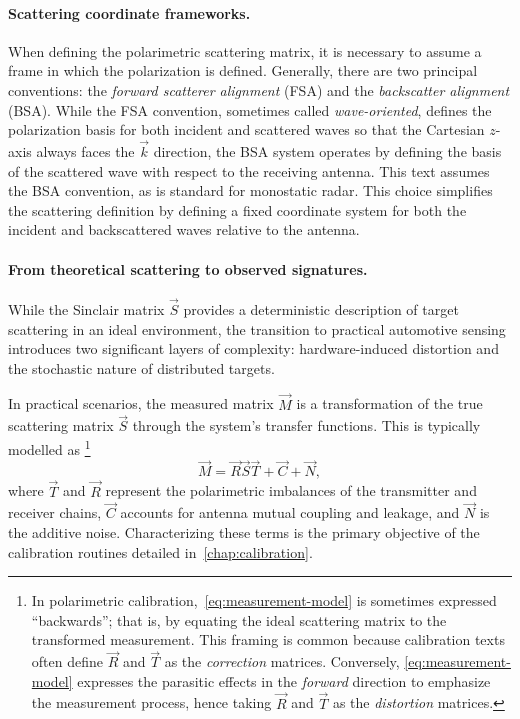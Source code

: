 \paragraph{Scattering coordinate frameworks.}
When defining the polarimetric scattering matrix, it is necessary to assume a frame in which the polarization is defined.
Generally, there are two principal conventions: the \emph{forward scatterer alignment} (FSA) and the \emph{backscatter alignment} (BSA).
While the FSA convention, sometimes called \emph{wave-oriented}, defines the polarization basis for both incident and scattered waves so that the Cartesian $z$-axis always faces the $\vec k$ direction, the BSA system operates by defining the basis of the scattered wave with respect to the receiving antenna.
This text assumes the BSA convention, as is standard for monostatic radar.
This choice simplifies the scattering definition by defining a fixed coordinate system for both the incident and backscattered waves relative to the antenna.

\paragraph{From theoretical scattering to observed signatures.}
While the Sinclair matrix $\vec S$ provides a deterministic description of target scattering in an ideal environment, the transition to practical automotive sensing introduces two significant layers of complexity: hardware-induced distortion and the stochastic nature of distributed targets.

In practical scenarios, the measured matrix $\vec M$ is a transformation of the true scattering matrix $\vec S$ through the system's transfer functions.
This is typically modelled as%
    \footnote{
        In polarimetric calibration,~\cref{eq:measurement-model} is sometimes expressed \enquote{backwards}; that is, by equating the ideal scattering matrix to the transformed measurement.
        This framing is common because calibration texts often define $\vec R$ and $\vec T$ as the \emph{correction} matrices.
        Conversely, \cref{eq:measurement-model} expresses the parasitic effects in the \emph{forward} direction to emphasize the measurement process, hence taking $\vec R$ and $\vec T$ as the \emph{distortion} matrices.
    }
\begin{equation}
    \label{eq:measurement-model}
    \vec M = \vec R \vec S \vec T + \vec C + \vec N,
\end{equation}
where $\vec T$ and $\vec R$ represent the polarimetric imbalances of the transmitter and receiver chains, $\vec C$ accounts for antenna mutual coupling and leakage, and $\vec N$ is the additive noise.
Characterizing these terms is the primary objective of the calibration routines detailed in~\cref{chap:calibration}.

